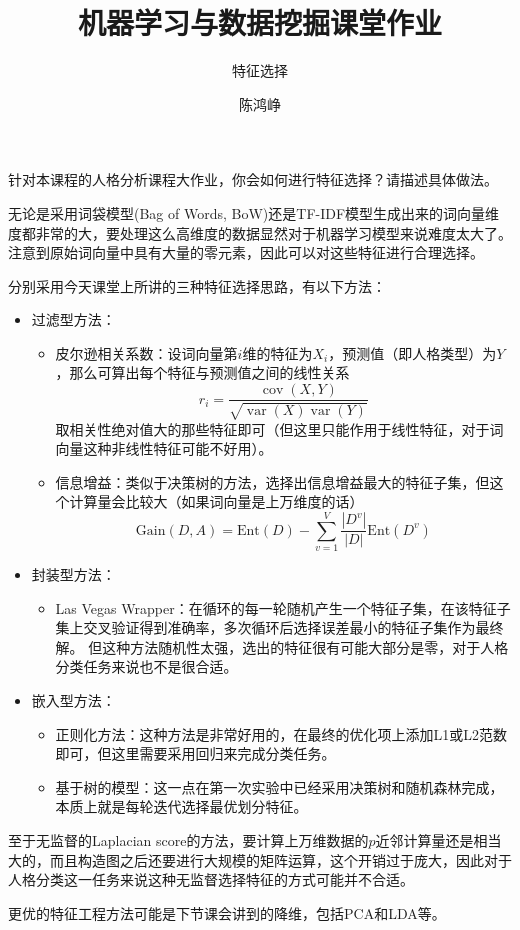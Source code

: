 \documentclass[logo,reportComp]{thesis}
\title{机器学习与数据挖掘课堂作业}
\subtitle{特征选择}
\author{陈鸿峥}
\begin{document}
\maketitle

\begin{question}
针对本课程的人格分析课程大作业，你会如何进行特征选择？请描述具体做法。
\end{question}
\begin{answer}
无论是采用词袋模型(Bag of Words, BoW)还是TF-IDF模型生成出来的词向量维度都非常的大，要处理这么高维度的数据显然对于机器学习模型来说难度太大了。
注意到原始词向量中具有大量的零元素，因此可以对这些特征进行合理选择。

分别采用今天课堂上所讲的三种特征选择思路，有以下方法：
\begin{itemize}
	\item 过滤型方法：
	\begin{itemize}
		\item 皮尔逊相关系数：设词向量第$i$维的特征为$X_i$，预测值（即人格类型）为$Y$，那么可算出每个特征与预测值之间的线性关系
		\[r_i=\frac{\mathop{cov}(X,Y)}{\sqrt{\mathop{var}(X)\mathop{var}(Y)}}\]
		取相关性绝对值大的那些特征即可（但这里只能作用于线性特征，对于词向量这种非线性特征可能不好用）。
		\item 信息增益：类似于决策树的方法，选择出信息增益最大的特征子集，但这个计算量会比较大（如果词向量是上万维度的话）
		\[\mathrm{Gain}(D,A)=\mathrm{Ent}(D)-\sum_{v=1}^V\frac{|D^v|}{|D|}\mathrm{Ent}(D^v)\]
	\end{itemize}
	\item 封装型方法：
	\begin{itemize}
		\item Las Vegas Wrapper：在循环的每一轮随机产生一个特征子集，在该特征子集上交叉验证得到准确率，多次循环后选择误差最小的特征子集作为最终解。
		但这种方法随机性太强，选出的特征很有可能大部分是零，对于人格分类任务来说也不是很合适。
	\end{itemize}
	\item 嵌入型方法：
	\begin{itemize}
		\item 正则化方法：这种方法是非常好用的，在最终的优化项上添加L1或L2范数即可，但这里需要采用回归来完成分类任务。
		\item 基于树的模型：这一点在第一次实验中已经采用决策树和随机森林完成，本质上就是每轮迭代选择最优划分特征。
	\end{itemize}
\end{itemize}

至于无监督的Laplacian score的方法，要计算上万维数据的$p$近邻计算量还是相当大的，而且构造图之后还要进行大规模的矩阵运算，这个开销过于庞大，因此对于人格分类这一任务来说这种无监督选择特征的方式可能并不合适。

更优的特征工程方法可能是下节课会讲到的降维，包括PCA和LDA等。

\end{answer}
\end{document}

